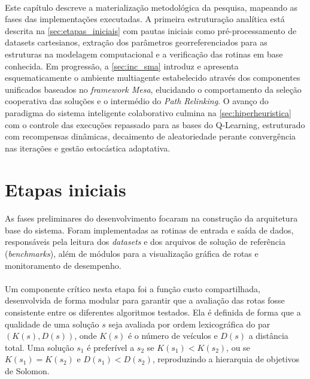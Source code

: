 \paragraph{}Este capítulo descreve a materialização metodológica da pesquisa, mapeando as fases das implementações executadas. A primeira estruturação analítica está descrita na \autoref{sec:etapas_iniciais} com pautas iniciais como pré-processamento de datasets cartesianos, extração dos parâmetros georreferenciados para as estruturas na modelagem computacional e a verificação das rotinas em base conhecida. Em progressão, a \autoref{sec:inc_sma} introduz e apresenta esquematicamente o ambiente multiagente estabelecido através dos componentes unificados baseados no \textit{framework Mesa}, elucidando o comportamento da seleção cooperativa das soluções e o intermédio do \textit{Path Relinking}. O avanço do paradigma do sistema inteligente colaborativo culmina na \autoref{sec:hiperheuristica} com o controle das execuções repassado para as bases do Q-Learning, estruturado com recompensas dinâmicas, decaimento de aleatoriedade perante convergência nas iterações e gestão estocástica adaptativa.

\section{Etapas iniciais}
\label{sec:etapas_iniciais}

\paragraph{} As fases preliminares do desenvolvimento focaram na construção da arquitetura base do sistema. Foram implementadas as rotinas de entrada e saída de dados, responsáveis pela leitura dos \textit{datasets} e dos arquivos de solução de referência (\textit{benchmarks}), além de módulos para a visualização gráfica de rotas e monitoramento de desempenho.

\paragraph{} Um componente crítico nesta etapa foi a função custo compartilhada, desenvolvida de forma modular para garantir que a avaliação das rotas fosse consistente entre os diferentes algoritmos testados. Ela é definida de forma que a qualidade de uma solução $s$ seja avaliada por ordem lexicográfica do par $(K(s), D(s))$, onde $K(s)$ é o número de veículos e $D(s)$ a distância total. Uma solução $s_1$ é preferível a $s_2$ se $K(s_1) < K(s_2)$, ou se $K(s_1) = K(s_2)$ e $D(s_1) < D(s_2)$, reproduzindo a hierarquia de objetivos de Solomon. 

